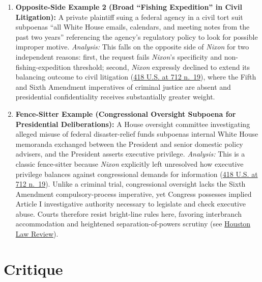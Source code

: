 \documentclass[12pt]{article}
\begin{document}
\begin{enumerate}
\item \textbf{Opposite-Side Example 2 (Broad ``Fishing Expedition'' in Civil Litigation):} A private plaintiff suing a federal agency in a civil tort suit subpoenas ``all White House emails, calendars, and meeting notes from the past two years'' referencing the agency's regulatory policy to look for possible improper motive. \textit{Analysis:} This falls on the opposite side of \textit{Nixon} for two independent reasons: first, the request fails \textit{Nixon}'s specificity and non-fishing-expedition threshold; second, \textit{Nixon} expressly declined to extend its balancing outcome to civil litigation (\href{https://supreme.justia.com/cases/federal/us/418/683/}{418 U.S. at 712 n.\ 19}), where the Fifth and Sixth Amendment imperatives of criminal justice are absent and presidential confidentiality receives substantially greater weight.

\item \textbf{Fence-Sitter Example (Congressional Oversight Subpoena for Presidential Deliberations):} A House oversight committee investigating alleged misuse of federal disaster-relief funds subpoenas internal White House memoranda exchanged between the President and senior domestic policy advisers, and the President asserts executive privilege. \textit{Analysis:} This is a classic fence-sitter because \textit{Nixon} explicitly left unresolved how executive privilege balances against congressional demands for information (\href{https://supreme.justia.com/cases/federal/us/418/683/}{418 U.S. at 712 n.\ 19}). Unlike a criminal trial, congressional oversight lacks the Sixth Amendment compulsory-process imperative, yet Congress possesses implied Article I investigative authority necessary to legislate and check executive abuse. Courts therefore resist bright-line rules here, favoring interbranch accommodation and heightened separation-of-powers scrutiny (see \href{https://houstonlawreview.org/article/30078-the-second-article-and-congressional-self-defense}{Houston Law Review}).
\end{enumerate}

\section{Critique}
\end{document}
